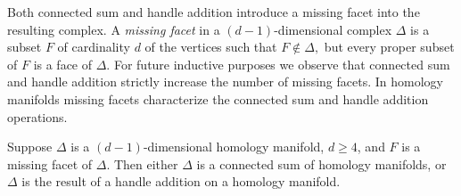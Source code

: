 \documentclass[ALCO,ThmDefs,Unicode,epreuves]{cedram}
\begin{document}
 Both connected sum and handle addition introduce a missing facet into the resulting complex. A \emph{missing facet} in a $(d-1)$-dimensional complex $\Delta$ is a subset $F$ of cardinality $d$ of the vertices such that $F \notin \Delta,$ but every proper subset of $F$ is a face of $\Delta.$ For future inductive purposes we observe that connected sum and handle addition strictly increase the number of missing facets. In homology manifolds missing facets characterize the connected sum and handle addition operations.
 
 \begin{prop} \label{missing facets}
 Suppose $\Delta$ is a $(d-1)$-dimensional homology manifold, $d \ge 4$, and $F$ is a missing facet of $\Delta.$ Then either $\Delta$ is a connected sum of homology manifolds, or $\Delta$ is the result of a handle addition on a homology manifold. 
 \end{prop}
 
\end{document}
